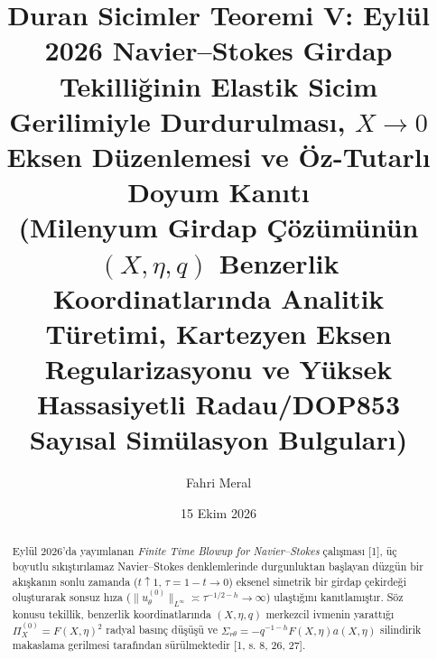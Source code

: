 \documentclass[12pt,a4paper]{article}
\title{\textbf{Duran Sicimler Teoremi V: Eylül 2026 Navier--Stokes Girdap Tekilliğinin Elastik Sicim Gerilimiyle Durdurulması, $X \to 0$ Eksen Düzenlemesi ve Öz-Tutarlı Doyum Kanıtı} \\[0.3cm]
\large (Milenyum Girdap Çözümünün $(X,\eta,q)$ Benzerlik Koordinatlarında Analitik Türetimi, Kartezyen Eksen Regularizasyonu ve Yüksek Hassasiyetli Radau/DOP853 Sayısal Simülasyon Bulguları)}
\author{Fahri Meral}
\date{15 Ekim 2026}
\begin{document}
\shorthandoff{=}

\maketitle

\begin{abstract}
Eylül 2026'da yayımlanan \textit{Finite Time Blowup for Navier--Stokes} çalışması [1], üç boyutlu sıkıştırılamaz Navier--Stokes denklemlerinde durgunluktan başlayan düzgün bir akışkanın sonlu zamanda ($t \uparrow 1$, $\tau = 1-t \to 0$) eksenel simetrik bir girdap çekirdeği oluşturarak sonsuz hıza ($\|u_\theta^{(0)}\|_{L^\infty} \asymp \tau^{-1/2-h} \to \infty$) ulaştığını kanıtlamıştır. Söz konusu tekillik, benzerlik koordinatlarında $(X, \eta, q)$ merkezcil ivmenin yarattığı $\Pi_X^{(0)} = F(X,\eta)^2$ radyal basınç düşüşü ve $\Sigma_{r\theta} = -q^{-1-h} F(X,\eta) a(X,\eta)$ silindirik makaslama gerilmesi tarafından sürülmektedir [1, s. 8, 26, 27].


\end{abstract}
\end{document}
